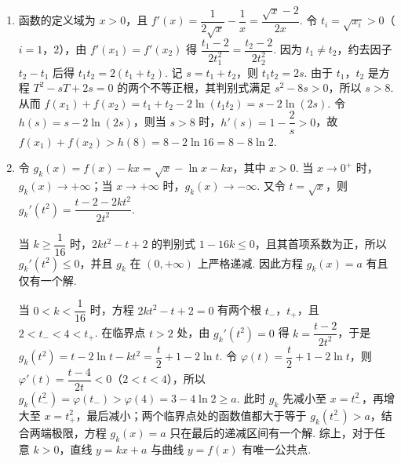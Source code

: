 \begin{solution}
\begin{enumerate}
  \item 函数的定义域为 \(x>0\)，且 \(f'(x)=\dfrac{1}{2\sqrt{x}}-\dfrac1x=\dfrac{\sqrt{x}-2}{2x}\). 令 \(t_i=\sqrt{x_i}>0\)（\(i=1\)，\(2\)），由 \(f'(x_1)=f'(x_2)\) 得 \(\dfrac{t_1-2}{2t_1^2}=\dfrac{t_2-2}{2t_2^2}\). 因为 \(t_1\ne t_2\)，约去因子 \(t_2-t_1\) 后得 \(t_1t_2=2(t_1+t_2)\). 记 \(s=t_1+t_2\)，则 \(t_1t_2=2s\). 由于 \(t_1\)，\(t_2\) 是方程 \(T^2-sT+2s=0\) 的两个不等正根，其判别式满足 \(s^2-8s>0\)，所以 \(s>8\). 从而 \(f(x_1)+f(x_2)=t_1+t_2-2\ln(t_1t_2)=s-2\ln(2s)\). 令 \(h(s)=s-2\ln(2s)\)，则当 \(s>8\) 时，\(h'(s)=1-\dfrac2s>0\)，故 \(f(x_1)+f(x_2)>h(8)=8-2\ln16=8-8\ln2\).
  \item 令 \(g_k(x)=f(x)-kx=\sqrt{x}-\ln x-kx\)，其中 \(x>0\). 当 \(x\to0^+\) 时，\(g_k(x)\to+\infty\)；当 \(x\to+\infty\) 时，\(g_k(x)\to-\infty\). 又令 \(t=\sqrt{x}\)，则 \(g_k'(t^2)=\dfrac{t-2-2kt^2}{2t^2}\).

  当 \(k\ge\dfrac1{16}\) 时，\(2kt^2-t+2\) 的判别式 \(1-16k\le0\)，且其首项系数为正，所以 \(g_k'(t^2)\le0\)，并且 \(g_k\) 在 \((0,+\infty)\) 上严格递减. 因此方程 \(g_k(x)=a\) 有且仅有一个解.

  当 \(0<k<\dfrac1{16}\) 时，方程 \(2kt^2-t+2=0\) 有两个根 \(t_-\)，\(t_+\)，且 \(2<t_-<4<t_+\). 在临界点 \(t>2\) 处，由 \(g_k'(t^2)=0\) 得 \(k=\dfrac{t-2}{2t^2}\)，于是 \(g_k(t^2)=t-2\ln t-kt^2=\dfrac t2+1-2\ln t\). 令 \(\varphi(t)=\dfrac t2+1-2\ln t\)，则 \(\varphi'(t)=\dfrac{t-4}{2t}<0\)（\(2<t<4\)），所以 \(g_k(t_-^2)=\varphi(t_-) >\varphi(4)=3-4\ln2\ge a\). 此时 \(g_k\) 先减小至 \(x=t_-^2\)，再增大至 \(x=t_+^2\)，最后减小；两个临界点处的函数值都大于等于 \(g_k(t_-^2)>a\)，结合两端极限，方程 \(g_k(x)=a\) 只在最后的递减区间有一个解. 综上，对于任意 \(k>0\)，直线 \(y=kx+a\) 与曲线 \(y=f(x)\) 有唯一公共点.
\end{enumerate}
\end{solution}
